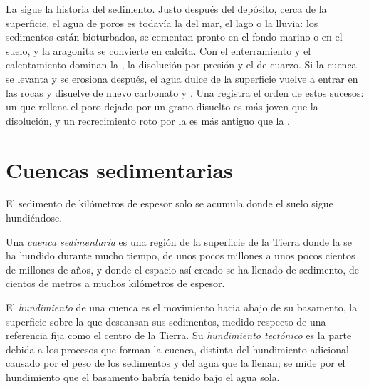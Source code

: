 La  sigue la historia del sedimento. Justo después del depósito, cerca de la superficie, el agua de poros es todavía la del mar, el lago o la lluvia: los sedimentos están bioturbados, se
cementan pronto en el fondo marino o en el suelo, y la aragonita se convierte en calcita. Con el enterramiento y el calentamiento dominan la , la disolución por presión y el  de cuarzo.
Si la cuenca se levanta y se erosiona después, el agua dulce de la superficie vuelve a entrar en las rocas y disuelve de nuevo carbonato y . Una  registra el orden de estos
sucesos: un  que rellena el poro dejado por un grano disuelto es más joven que la disolución, y un recrecimiento roto por la  es más antiguo que la .

\section{Cuencas sedimentarias}\label{sec:b1:diagenesis-basins:basins}

El sedimento de kilómetros de espesor solo se acumula donde el suelo sigue hundiéndose.

\begin{definition}\label{def:b1:diagenesis-basins:basin}
Una \emph{cuenca sedimentaria} es una región de la superficie de la Tierra donde la  se ha hundido durante mucho tiempo, de unos pocos millones a unos pocos cientos de millones de años, y donde el espacio así creado se ha llenado de sedimento, de cientos de metros a muchos kilómetros de espesor.
\end{definition}

\begin{definition}\label{def:b1:diagenesis-basins:subsidence}
El \emph{hundimiento} de una cuenca es el movimiento hacia abajo de su basamento, la superficie sobre la que descansan sus sedimentos, medido respecto de una referencia fija como el centro de la Tierra. Su
\emph{hundimiento tectónico} es la parte debida a los procesos que forman la cuenca, distinta del hundimiento adicional causado por el peso de los sedimentos y del agua que la llenan; se mide por el hundimiento que el basamento habría tenido bajo el agua sola.
\end{definition}

